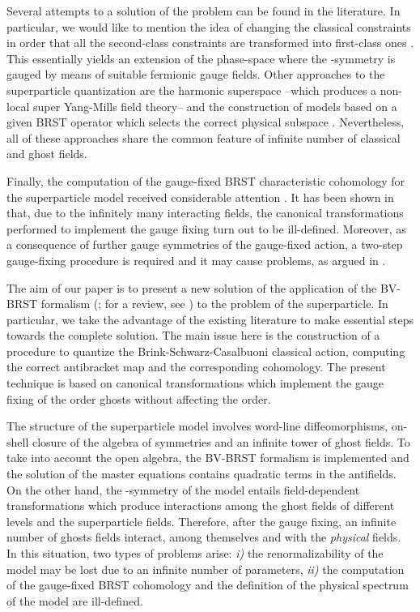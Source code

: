 \documentclass[a4paper,12pt]{article}
\begin{document}
Several attempts to a solution of the problem can be found in the
literature. In particular, we would like to mention the idea of
changing the classical constraints in order that all the second-class
constraints are transformed into first-class ones \cite{GH,ilk}. This
essentially yields an extension of the phase-space where the
\myHighlight{$\kappa$}\coordHE{}-symmetry is gauged by means of suitable fermionic gauge
fields.  Other approaches to the superparticle quantization are the
harmonic superspace \cite{harmo} --which produces a non-local super
Yang-Mills field theory-- and the construction of models based on a
given BRST operator which selects the correct physical subspace
\cite{kallosh}.  Nevertheless, all of these approaches share the
common feature of infinite number of classical and ghost fields.

Finally, the computation of the gauge-fixed BRST characteristic
cohomology \cite{anti_coho,barnich} for the superparticle model
received considerable attention
\cite{kallosh,Lindstrom_BS,Lindstrom,Bastianelli}. It has been shown
in \cite{Bastianelli} that, due to the infinitely many interacting
fields, the canonical transformations performed to implement the gauge
fixing turn out to be ill-defined.  Moreover, as a consequence of
further gauge symmetries of the gauge-fixed action, a two-step
gauge-fixing procedure is required and it may cause problems, as
argued in \cite{kallosh}.

The aim of our paper is to present a new solution of the application
of the BV-BRST formalism (\cite{BRST,BV}; for a review, see
\cite{henneaux,cano,gomis}) to the
problem of the superparticle. In particular, we take the advantage of
the existing literature to make essential steps towards the complete
solution. The main issue here is the construction of a procedure to
quantize the Brink-Schwarz-Casalbuoni classical action, computing the
correct antibracket map and the corresponding cohomology. The present
technique is based on canonical transformations which implement the
gauge fixing of the \coordHE{} order ghosts without affecting the
\coordHE{} order.

The structure of the superparticle model involves word-line
diffeomorphisms, on-shell closure of the algebra of symmetries and an
infinite tower of ghost fields. To take into account the open algebra,
the BV-BRST formalism is implemented and the solution of the master
equations contains quadratic terms in the antifields. On the other
hand, the \myHighlight{$\kappa$}\coordHE{}-symmetry of the model entails field-dependent
transformations which produce interactions among the ghost fields of
different levels and the superparticle fields. Therefore, after the
gauge fixing, an infinite number of ghosts fields interact, among
themselves and with the {\it physical} fields.  In this situation, two
types of problems arise: {\it i)} the renormalizability of the model
may be lost due to an infinite number of parameters, {\it ii)} the
computation of the gauge-fixed BRST cohomology and the definition of
the physical spectrum of the model are ill-defined.
\end{document}
